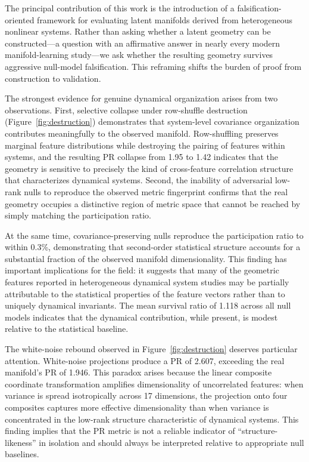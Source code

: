 \documentclass[%
 aip,
 chaos,
 amsmath,amssymb,
 reprint,
]{revtex4-2}
\begin{document}
The principal contribution of this work is the introduction of a falsification-oriented framework for evaluating latent manifolds derived from heterogeneous nonlinear systems. Rather than asking whether a latent geometry can be constructed---a question with an affirmative answer in nearly every modern manifold-learning study---we ask whether the resulting geometry survives aggressive null-model falsification. This reframing shifts the burden of proof from construction to validation.

The strongest evidence for genuine dynamical organization arises from two observations. First, selective collapse under row-shuffle destruction (Figure~\ref{fig:destruction}) demonstrates that system-level covariance organization contributes meaningfully to the observed manifold. Row-shuffling preserves marginal feature distributions while destroying the pairing of features within systems, and the resulting PR collapse from 1.95 to 1.42 indicates that the geometry is sensitive to precisely the kind of cross-feature correlation structure that characterizes dynamical systems. Second, the inability of adversarial low-rank nulls to reproduce the observed metric fingerprint confirms that the real geometry occupies a distinctive region of metric space that cannot be reached by simply matching the participation ratio.

At the same time, covariance-preserving nulls reproduce the participation ratio to within 0.3\%, demonstrating that second-order statistical structure accounts for a substantial fraction of the observed manifold dimensionality. This finding has important implications for the field: it suggests that many of the geometric features reported in heterogeneous dynamical system studies may be partially attributable to the statistical properties of the feature vectors rather than to uniquely dynamical invariants. The mean survival ratio of 1.118 across all null models indicates that the dynamical contribution, while present, is modest relative to the statistical baseline.

The white-noise rebound observed in Figure~\ref{fig:destruction} deserves particular attention. White-noise projections produce a PR of 2.607, exceeding the real manifold's PR of 1.946. This paradox arises because the linear composite coordinate transformation amplifies dimensionality of uncorrelated features: when variance is spread isotropically across 17 dimensions, the projection onto four composites captures more effective dimensionality than when variance is concentrated in the low-rank structure characteristic of dynamical systems. This finding implies that the PR metric is not a reliable indicator of ``structure-likeness'' in isolation and should always be interpreted relative to appropriate null baselines.
\end{document}
